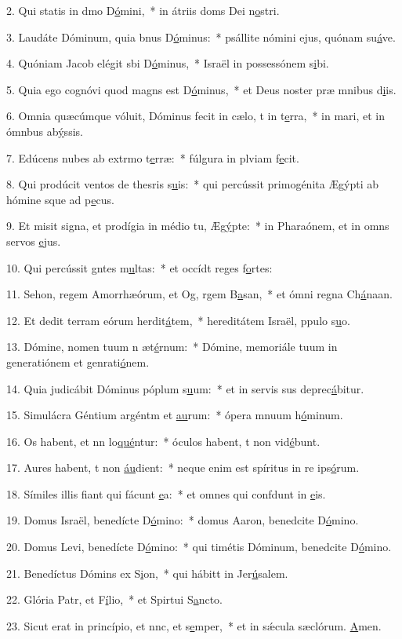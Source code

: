 2. Qui statis in dmo D\uline{ó}mini,~* in átriis doms Dei n\uline{o}stri.\par 
3. Laudáte Dóminum, quia bnus D\uline{ó}minus:~* psállite nómini ejus, quónam su\uline{á}ve.\par 
4. Quóniam Jacob elégit sbi D\uline{ó}minus,~* Israël in possessónem s\uline{i}bi.\par 
5. Quia ego cognóvi quod magns est D\uline{ó}minus,~* et Deus noster præ mnibus d\uline{i}is.\par 
6. Omnia quæcúmque vóluit, Dóminus fecit in cælo, t in t\uline{e}rra,~* in mari, et in ómnbus ab\uline{ý}ssis.\par 
7. Edúcens nubes ab extrmo t\uline{e}rræ:~* fúlgura in plviam f\uline{e}cit.\par 
8. Qui prodúcit ventos de thesris s\uline{u}is:~* qui percússit primogénita Ægýpti ab hómine sque ad p\uline{e}cus.\par 
9. Et misit signa, et prodígia in médio tu, Æg\uline{ý}pte:~* in Pharaónem, et in omns servos \uline{e}jus.\par 
10. Qui percússit gntes m\uline{u}ltas:~* et occídt reges f\uline{o}rtes:\par 
11. Sehon, regem Amorrhæórum, et Og, rgem B\uline{a}san,~* et ómni regna Ch\uline{á}naan.\par 
12. Et dedit terram eórum herdit\uline{á}tem,~* hereditátem Israël, ppulo s\uline{u}o.\par 
13. Dómine, nomen tuum n æt\uline{é}rnum:~* Dómine, memoriále tuum in generatiónem et genrati\uline{ó}nem.\par 
14. Quia judicábit Dóminus póplum s\uline{u}um:~* et in servis sus deprec\uline{á}bitur.\par 
15. Simulácra Géntium argéntm et \uline{au}rum:~* ópera mnuum h\uline{ó}minum.\par 
16. Os habent, et nn lo\uline{qué}ntur:~* óculos habent, t non vid\uline{é}bunt.\par 
17. Aures habent, t non \uline{áu}dient:~* neque enim est spíritus in re ips\uline{ó}rum.\par 
18. Símiles illis fiant qui fácunt \uline{e}a:~* et omnes qui confdunt in \uline{e}is.\par 
19. Domus Israël, benedícte D\uline{ó}mino:~* domus Aaron, benedcite D\uline{ó}mino.\par 
20. Domus Levi, benedícte D\uline{ó}mino:~* qui timétis Dóminum, benedcite D\uline{ó}mino.\par 
21. Benedíctus Dómins ex S\uline{i}on,~* qui hábitt in Jer\uline{ú}salem.\par 
22. Glória Patr, et F\uline{í}lio,~* et Spirtui S\uline{a}ncto.\par 
23. Sicut erat in princípio, et nnc, et s\uline{e}mper,~* et in sǽcula sæclórum. \uline{A}men.\par 
